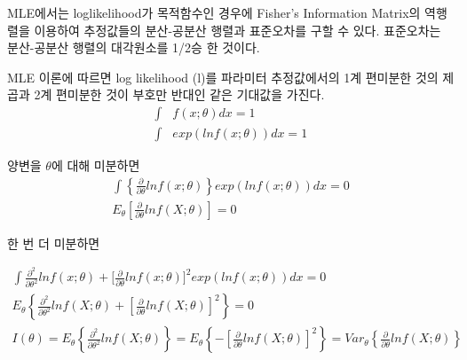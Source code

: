 \documentclass[
  10pt,
  krantz2,
  a4paper]{krantz}
\theoremstyle{definition}
\theoremstyle{definition}
\theoremstyle{definition}
\theoremstyle{remark}
\begin{document}
MLE에서는 loglikelihood가 목적함수인 경우에 Fisher's Information Matrix의 역행렬을 이용하여 추정값들의 분산-공분산 행렬과 표준오차를 구할 수 있다. 표준오차는 분산-공분산 행렬의 대각원소를 1/2승 한 것이다.

MLE 이론에 따르면 log likelihood (l)를 파라미터 추정값에서의 1계 편미분한 것의 제곱과 2계 편미분한 것이 부호만 반대인 같은 기대값을 가진다.
\begin{equation}
\begin{split}
  \int & f(x;\theta)dx = 1 \\
  \int & exp(lnf(x;\theta))dx = 1
\end{split}
\label{eq:mle-theory}
\end{equation}

양변을 \(\theta\)에 대해 미분하면
\begin{equation}
\begin{split}
\int\left\{ \frac{\partial}{\partial\theta}lnf(x;\theta) \right\} exp(lnf(x;\theta))dx = 0 \\
E_{\theta}\left\lbrack \frac{\partial}{\partial\theta}lnf(X;\theta) \right\rbrack = 0
\end{split}
\label{eq:theta-differential}
\end{equation}

한 번 더 미분하면

\begin{equation}
\begin{split}
\int{\frac{\partial^{2}}{\partial\theta^{2}}lnf(x;\theta) + \lbrack \frac{\partial}{\partial\theta}lnf(x;\theta) \rbrack^{2} } exp(lnf(x;\theta))dx = 0 \\
E_{\theta}\left\{ \frac{\partial^{2}}{\partial\theta^{2}}lnf(X;\theta) + \left\lbrack \frac{\partial}{\partial\theta}lnf(X;\theta) \right\rbrack^{2} \right\} = 0 \\
I(\theta) = E_{\theta}\left\{ \frac{\partial^{2}}{\partial\theta^{2}}lnf(X;\theta) \right\} = E_{\theta}\left\{ - \left\lbrack \frac{\partial}{\partial\theta}lnf(X;\theta) \right\rbrack^{2} \right\} = Var_{\theta}\left\{ \frac{\partial}{\partial\theta}lnf(X;\theta) \right\} 
\end{split}
\label{eq:diff-diff}
\end{equation}
\end{document}
